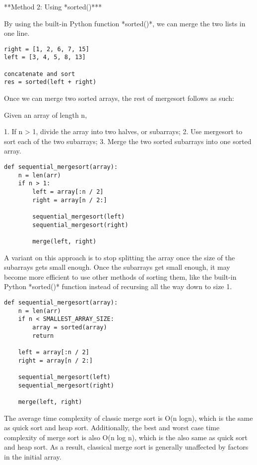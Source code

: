 **Method 2: Using *sorted()***

By using the built-in Python function *sorted()*, we can merge the two lists in one line.

\begin{verbatim}
right = [1, 2, 6, 7, 15]
left = [3, 4, 5, 8, 13]

concatenate and sort
res = sorted(left + right)
\end{verbatim}

Once we can merge two sorted arrays, the rest of mergesort follows as such:

Given an array of length n,

1. If n > 1, divide the array into two halves, or subarrays;
2. Use mergesort to sort each of the two subarrays;
3. Merge the two sorted subarrays into one sorted array.

\begin{verbatim}
def sequential_mergesort(array):
    n = len(arr)
    if n > 1:
        left = array[:n / 2]
        right = array[n / 2:]

        sequential_mergesort(left)
        sequential_mergesort(right)

        merge(left, right)
\end{verbatim}

A variant on this approach is to stop splitting the array once the size of the subarrays gets small enough. Once the
subarrays get small enough, it may become more efficient to use other methods of sorting them, like the built-in
Python *sorted()* function instead of recursing all the way down to size 1.

\begin{verbatim}
def sequential_mergesort(array):
    n = len(arr)
    if n < SMALLEST_ARRAY_SIZE:
        array = sorted(array)
        return

    left = array[:n / 2]
    right = array[n / 2:]

    sequential_mergesort(left)
    sequential_mergesort(right)

    merge(left, right)
\end{verbatim}

The average time complexity of classic merge sort is O(n logn), which is the same as quick sort and heap sort.
Additionally, the best and worst case time complexity of merge sort is also O(n log n), which is the also same as quick
sort and heap sort. As a result, classical merge sort is generally unaffected by factors in the initial array.

